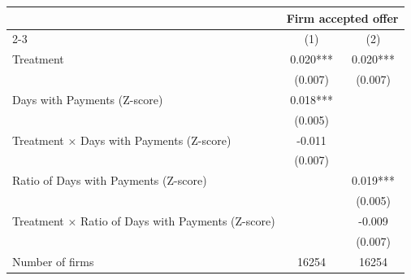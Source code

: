 \begin{tabular}[t]{lcc}
\toprule
  & \multicolumn{2}{c}{Firm accepted offer} \\
  \cmidrule(lr){2-3} 
  & (1)  & (2)  \\
\midrule
Treatment & 0.020*** & 0.020***\\
 & (0.007) & (0.007)\\
Days with Payments (Z-score) & 0.018*** & \\
 & (0.005) & \\
Treatment × Days with Payments (Z-score) & -0.011 & \\
 & (0.007) & \\
Ratio of Days with Payments (Z-score) &  & 0.019***\\
 &  & (0.005)\\
Treatment × Ratio of Days with Payments (Z-score) &  & -0.009\\
 &  & (0.007)\\
\midrule
Number of firms & 16254 & 16254\\
\bottomrule
\end{tabular}

